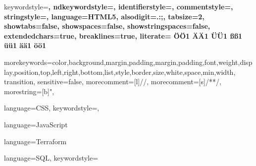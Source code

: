  {%
  keywordstyle=\color{lightblack}\bfseries,
  ndkeywordstyle=\color{lightblack}\bfseries,
  identifierstyle=\color{lightblack},
  commentstyle=\color{green}\ttfamily,
  stringstyle=\color{darkred}\ttfamily,
  language=HTML5,
  alsodigit={.:;},	
  tabsize=2,
  showtabs=false,
  showspaces=false,
  showstringspaces=false,
  extendedchars=true,
  breaklines=true,
  literate=%
  {Ö}{{\"O}}1
  {Ä}{{\"A}}1
  {Ü}{{\"U}}1
  {ß}{{\ss}}1
  {ü}{{\"u}}1
  {ä}{{\"a}}1
  {ö}{{\"o}}1
}

{morekeywords={color,background,margin,padding,margin,padding,font,weight,display,position,top,left,right,bottom,list,style,border,size,white,space,min,width, 	transition}, 
	sensitive=false, 
	morecomment=[l]{//}, 
	morecomment=[s]{/*}{*/}, 
	morestring=[b]", 
}

 {%
  language=CSS,
  keywordstyle=\color{lightblack},
}

 {
  language=JavaScript
}

 {
  language=Terraform
}

 {
  language=SQL,
  keywordstyle=\color{azure}  
}

